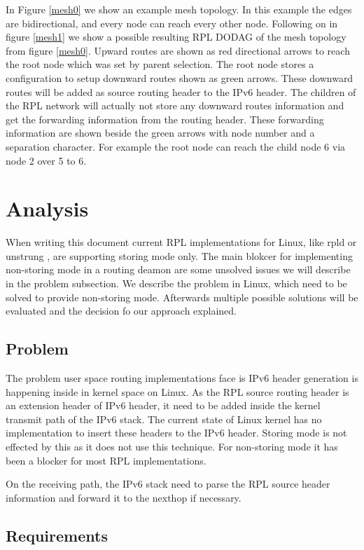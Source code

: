 \documentclass[letterpaper]{article}
\begin{document}
In Figure \ref{mesh0} we show an example mesh topology. In this example the
edges are bidirectional, and every node can reach every other node. Following on
in figure \ref{mesh1} we show a possible resulting RPL DODAG of the mesh topology from figure \ref{mesh0}.
Upward routes are shown as red directional arrows to reach the root node which was set by parent selection.
The root node stores a configuration to setup downward routes shown as green arrows.
These downward routes will be added as source routing header to the IPv6 header.
The children of the RPL network will actually not store any downward routes information and get the forwarding information from the routing header.
These forwarding information are shown beside the green arrows with node number and a separation character.
For example the root node can reach the child node 6 via node 2 over 5 to 6.

\section{Analysis}

When writing this document current RPL implementations for Linux, like rpld or
unstrung \cite{unstrung}, are supporting storing mode only.
The main blokcer for implementing non-storing mode in a routing deamon are some
unsolved issues we will describe in the problem subsection. We describe the
problem in Linux, which need to be solved to provide non-storing mode.
Afterwards multiple possible solutions will be evaluated and the decision fo our
approach explained.

\subsection{Problem}

The problem user space routing implementations face is IPv6 header generation is
happening inside in kernel space on Linux.
As the RPL source routing header is an extension header of IPv6 header, it need to be added inside the kernel transmit path of the IPv6 stack.
The current state of Linux kernel has no implementation to insert these headers to the IPv6 header.
Storing mode is not effected by this as it does not use this technique. For
non-storing mode it has been a blocker for most RPL implementations.

On the receiving path, the IPv6 stack need to parse the RPL source header information and forward it to the nexthop if necessary.

\subsection{Requirements}
\end{document}
